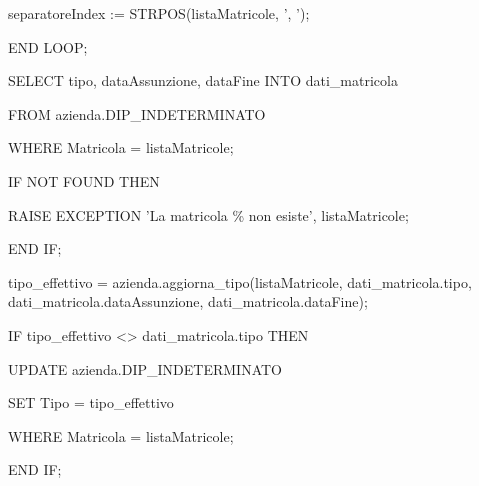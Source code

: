 \begin{flushleft}
\begin{description}
\begin{description}
\begin{description}
                            \vspace{0.5cm}

                            \item separatoreIndex := STRPOS(listaMatricole, ', ');
                        \end{description}
                        \item END LOOP;
                        \item SELECT tipo, dataAssunzione, dataFine INTO dati\_matricola
                        \item FROM azienda.DIP\_INDETERMINATO
                        \item WHERE Matricola = listaMatricole;
                        
                        \vspace{0.5cm}
                        
                        \item IF NOT FOUND THEN
                                \begin{description}
                                    \item RAISE EXCEPTION 'La matricola \% non esiste', listaMatricole;
                                \end{description}
                            \item END IF;

                            \vspace{0.5cm}
                            
                            \item tipo\_effettivo = azienda.aggiorna\_tipo(listaMatricole, dati\_matricola.tipo, dati\_matricola.dataAssunzione, dati\_matricola.dataFine);
                            \item IF tipo\_effettivo <> dati\_matricola.tipo THEN
                                \begin{description}
                                    \item UPDATE azienda.DIP\_INDETERMINATO
                                    \item SET Tipo = tipo\_effettivo
                                    \item WHERE Matricola = listaMatricole;
                                \end{description}
                            \item END IF;


\end{description}
\end{description}
\end{flushleft}
